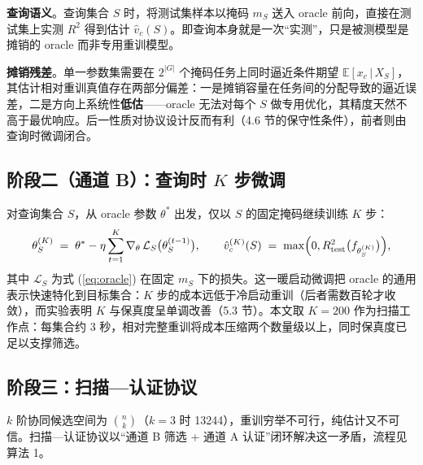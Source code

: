 \documentclass[10.5pt,compsoc,UTF8]{CjC}
\theoremstyle{mystyle}
\begin{document}
\textbf{查询语义}。查询集合 $S$ 时，将测试集样本以掩码 $m_S$ 送入 oracle 前向，直接在测试集上实测 $R^2$ 得到估计 $\hat v_c(S)$。即查询本身就是一次“实测”，只是被测模型是摊销的 oracle 而非专用重训模型。

\textbf{摊销残差}。单一参数集需要在 $2^{|G|}$ 个掩码任务上同时逼近条件期望 $\mathbb{E}[x_c\,|\,X_S]$，其估计相对重训真值存在两部分偏差：一是摊销容量在任务间的分配导致的逼近误差，二是方向上系统性\textbf{低估}——oracle 无法对每个 $S$ 做专用优化，其精度天然不高于最优响应。后一性质对协议设计反而有利（4.6 节的保守性条件），前者则由查询时微调闭合。

\subsection{阶段二（通道 B）：查询时 $K$ 步微调}

对查询集合 $S$，从 oracle 参数 $\theta^{*}$ 出发，仅以 $S$ 的固定掩码继续训练 $K$ 步：
\begin{equation}
\theta_S^{(K)}\;=\;\theta^{*}-\eta\sum_{t=1}^{K}\nabla_{\theta}\,\mathcal{L}_S\bigl(\theta_S^{(t-1)}\bigr),\qquad
\hat v_c^{(K)}(S)\;=\;\max\Bigl(0,R^2_{\mathrm{test}}\bigl(f_{\theta_S^{(K)}}\bigr)\Bigr),
\label{eq:finetune}
\end{equation}
其中 $\mathcal{L}_S$ 为式 (\ref{eq:oracle}) 在固定 $m_S$ 下的损失。这一暖启动微调把 oracle 的通用表示快速特化到目标集合：$K$ 步的成本远低于冷启动重训（后者需数百轮才收敛），而实验表明 $K$ 与保真度呈单调改善（5.3 节）。本文取 $K=200$ 作为扫描工作点：每集合约 3 秒，相对完整重训将成本压缩两个数量级以上，同时保真度已足以支撑筛选。

\subsection{阶段三：扫描—认证协议}

$k$ 阶协同候选空间为 $\binom{n}{k}$（$k=3$ 时 13244），重训穷举不可行，纯估计又不可信。扫描—认证协议以“通道 B 筛选 + 通道 A 认证”闭环解决这一矛盾，流程见算法 1。
\end{document}
